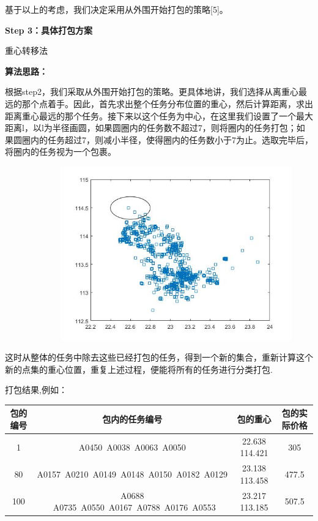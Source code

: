 \documentclass{ctexart}
\begin{document}
  基于以上的考虑，我们决定采用从外围开始打包的策略[5]。

\textbf{Step 3：具体打包方案}


重心转移法

\textbf{算法思路：}

根据step2，我们采取从外围开始打包的策略。更具体地讲，我们选择从离重心最远的那个点着手。因此，首先求出整个任务分布位置的重心，然后计算距离，求出距离重心最远的那个任务。接下来以这个任务为中心，在这里我们设置了一个最大距离l，以l为半径画圆，如果圆圈内的任务数不超过7，则将圈内的任务打包；如果圆圈内的任务超过7，则减小半径，使得圈内的任务数小于7为止。选取完毕后，将圈内的任务视为一个包裹。

 \ \ \ \ \ \ \  \ \ \  \ \ \ \includegraphics[width=10cm]{16.jpg}

  这时从整体的任务中除去这些已经打包的任务，得到一个新的集合，重新计算这个新的点集的重心位置，重复上述过程，便能将所有的任务进行分类打包.

打包结果,例如：

\begin{table}[!h]\center\scriptsize
\begin{tabular}{|c|c|c|c|}
\hline

包的编号	&包内的任务编号	&包的重心&	包的实际价格		\\
\hline
1	&A0450\  A0038\  A0063\  A0050	&22.638 114.421&	305	\\
\hline
80&	A0157\   A0210\   A0149\   A0148\   A0150\   A0182\   A0129	&23.138 113.458&	477.5		\\
\hline
100	&A0688 \  A0735\   A0550\   A0167\   A0788\   A0176\   A0553&	23.217 113.185	&507.5	\\
\hline

\end{tabular}
\end{table}
\end{document}
